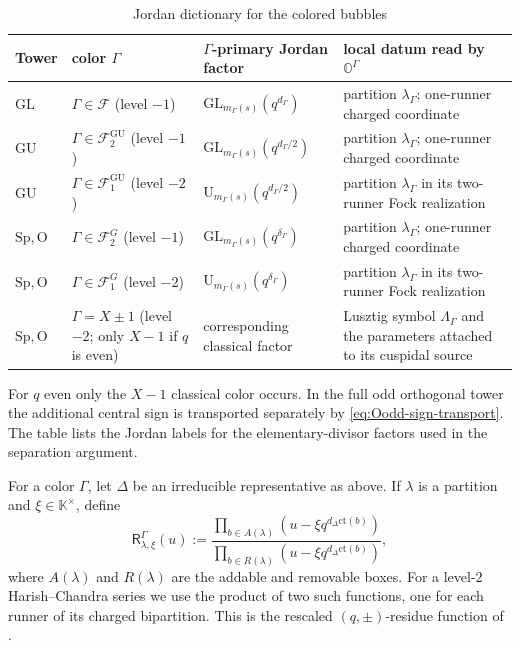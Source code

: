 \documentclass[12pt]{amsart}
\numberwithin{itemcounter}{subsection}
\theoremstyle{plain}
\theoremstyle{definition}
\theoremstyle{remark}
\numberwithin{equation}{section}
\def\bbK{\mathbb{K}}
\def\bbO{\mathbb{O}}
\def\calF{\mathcal{F}}
\def\O{\mathrm{O}}
\def\Sp{\mathrm{Sp}}
\def\GL{\mathrm{GL}}
\def\GU{\mathrm{GU}}
\def\ct{{{\text{ct}}}}
\begin{document}
\begin{table}[H]
\centering
\small
\renewcommand{\arraystretch}{1.18}
\caption{Jordan dictionary for the colored bubbles}
\label{tab:jordan-colored-bubbles}
\begin{tabular}{@{}p{}p{}p{}p{}@{}}
\hline
Tower & color $\Gamma$ & $\Gamma$-primary Jordan factor & local datum read by $\bbO^\Gamma$ \\
\hline
$\GL$
& $\Gamma\in\calF$ (level $-1$)
& $\GL_{m_\Gamma(s)}(q^{d_\Gamma})$
& partition $\lambda_\Gamma$; one-runner charged coordinate \\
$\GU$
& $\Gamma\in\calF^{\GU}_2$ (level $-1$)
& $\GL_{m_\Gamma(s)}(q^{d_\Gamma/2})$
& partition $\lambda_\Gamma$; one-runner charged coordinate \\
$\GU$
& $\Gamma\in\calF^{\GU}_1$ (level $-2$)
& $\mathrm U_{m_\Gamma(s)}(q^{d_\Gamma/2})$
& partition $\lambda_\Gamma$ in its two-runner Fock realization \\
$\Sp,\O$
& $\Gamma\in\calF^G_2$ (level $-1$)
& $\GL_{m_\Gamma(s)}(q^{\delta_\Gamma})$
& partition $\lambda_\Gamma$; one-runner charged coordinate \\
$\Sp,\O$
& $\Gamma\in\calF^G_1$ (level $-2$)
& $\mathrm U_{m_\Gamma(s)}(q^{\delta_\Gamma})$
& partition $\lambda_\Gamma$ in its two-runner Fock realization \\
$\Sp,\O$
& $\Gamma=X\pm1$ (level $-2$; only $X-1$ if $q$ is even)
& corresponding classical factor
& Lusztig symbol $\Lambda_\Gamma$ and the parameters attached to its cuspidal source \\
\hline
\end{tabular}
\end{table}

For $q$ even only the $X-1$ classical color occurs.  In the full odd
orthogonal tower the additional central sign is transported separately by
\eqref{eq:Oodd-sign-transport}.  The table lists the Jordan labels for the elementary-divisor factors used in the separation argument.

For a color \(\Gamma\), let \(\Delta\) be an irreducible representative as above. If \(\lambda\) is a partition and
\(\xi\in\bbK^\times\), define
\begin{equation}\label{eq:local-residue-function}
\mathsf R^{\Gamma}_{\lambda,\xi}(u):=
\frac{\displaystyle\prod_{b\in A(\lambda)}(u-\xi q^{d_\Delta\ct(b)})}
     {\displaystyle\prod_{b\in R(\lambda)}(u-\xi q^{d_\Delta\ct(b)})},
\end{equation}
where \(A(\lambda)\) and \(R(\lambda)\) are the addable and removable boxes.
For a level-$2$ Harish--Chandra series we use the product of two such functions,
one for each runner of its charged bipartition. This is the rescaled
\((q,\pm)\)-residue function of \cite[\S4.3.3]{LSZ25}.
\end{document}
